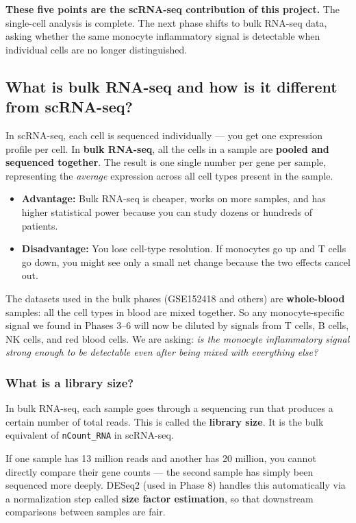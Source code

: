 \documentclass[11pt, a4paper]{article}
\begin{document}
\textbf{These five points are the scRNA-seq contribution of this project.}
The single-cell analysis is complete. The next phase shifts to bulk RNA-seq data,
asking whether the same monocyte inflammatory signal is detectable when individual
cells are no longer distinguished.

\subsection{What is bulk RNA-seq and how is it different from scRNA-seq?}

In scRNA-seq, each cell is sequenced individually — you get one expression profile per cell.
In \textbf{bulk RNA-seq}, all the cells in a sample are \textbf{pooled and sequenced together}.
The result is one single number per gene per sample, representing the \textit{average}
expression across all cell types present in the sample.

\begin{itemize}[nosep]
  \item \textbf{Advantage:} Bulk RNA-seq is cheaper, works on more samples, and has higher
        statistical power because you can study dozens or hundreds of patients.
  \item \textbf{Disadvantage:} You lose cell-type resolution. If monocytes go up and T cells
        go down, you might see only a small net change because the two effects cancel out.
\end{itemize}

The datasets used in the bulk phases (GSE152418 and others) are \textbf{whole-blood} samples:
all the cell types in blood are mixed together. So any monocyte-specific signal we found
in Phases 3–6 will now be diluted by signals from T cells, B cells, NK cells, and red blood cells.
We are asking: \textit{is the monocyte inflammatory signal strong enough to be detectable
even after being mixed with everything else?}

\subsubsection*{What is a library size?}

In bulk RNA-seq, each sample goes through a sequencing run that produces a certain number
of total reads. This is called the \textbf{library size}. It is the bulk equivalent of
\texttt{nCount\_RNA} in scRNA-seq.

If one sample has 13 million reads and another has 20 million, you cannot directly compare
their gene counts — the second sample has simply been sequenced more deeply.
DESeq2 (used in Phase 8) handles this automatically via a normalization step called
\textbf{size factor estimation}, so that downstream comparisons between samples are fair.
\end{document}
